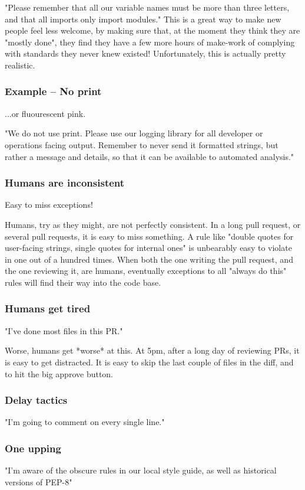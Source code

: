 "Please remember that all our variable names must be more than
three letters,
and that all imports only import modules."
This is a great way to make new people feel less welcome,
by making sure that,
at the moment they think they are "mostly done",
they find they have a few more hours of make-work
of complying with standards they never knew existed!
Unfortunately, this is actually pretty realistic.

\begin{frame}
\frametitle{Example -- No print}
...or fluourescent pink.
\end{frame}

"We do not use print.
Please use our logging library for all developer or operations facing
output.
Remember to never send it formatted strings,
but rather a message and details,
so that it can be available to automated analysis."

\begin{frame}
\frametitle{Humans are inconsistent}
Easy to miss exceptions!
\end{frame}

Humans,
try as they might,
are not perfectly consistent.
In a long pull request,
or several pull requests,
it is easy to miss something.
A rule like
"double quotes for user-facing strings,
single quotes for internal ones"
is unbearably easy to violate in one out of a hundred times.
When both the one writing the pull request,
and the one reviewing it,
are humans,
eventually exceptions to all "always do this"
rules will find their way into the code base.

\begin{frame}
\frametitle{Humans get tired}
"I've done most files in this PR."
\end{frame}

Worse,
humans get *worse* at this.
At 5pm,
after a long day of reviewing PRs,
it is easy to get distracted.
It is easy to skip the last couple of files
in the diff,
and to hit the big approve button.



\begin{frame}
\frametitle{Delay tactics}
"I'm going to comment on every single line."
\end{frame}

\begin{frame}
\frametitle{One upping}
"I'm aware of the obscure rules in our local style guide,
as well as historical versions of PEP-8"
\end{frame}

